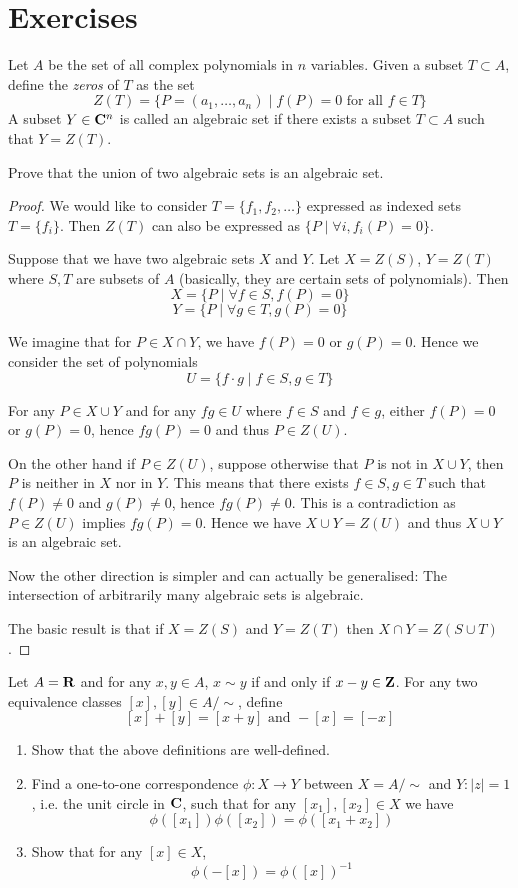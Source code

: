 \section*{Exercises}
\begin{prbm}
Let $A$ be the set of all complex polynomials in $n$ variables. Given a subset $T \subset A$, define the \textit{zeros} of $T$ as the set
\[ Z(T) = \{P=(a_1,\dots,a_n) \mid f(P)=0 \text{ for all } f \in T\} \]
A subset $Y \in \mathbf C^n$ is called an algebraic set if there exists a subset $T \subset A$ such that $Y=Z(T)$.

Prove that the union of two algebraic sets is an algebraic set.
\end{prbm}
\begin{proof}
We would like to consider $T=\{f_1, f_2, \dots\}$ expressed as indexed sets $T=\{f_i\}$. Then $Z(T)$ can also be expressed as $\{P \mid \forall i, f_i(P)=0\}$.

Suppose that we have two algebraic sets $X$ and $Y$. Let $X=Z(S)$, $Y=Z(T)$ where $S,T$ are subsets of $A$ (basically, they are certain sets of polynomials). Then
\[ X=\{P \mid \forall f \in S, f(P)=0\} \]
\[ Y=\{P \mid \forall g \in T, g(P)=0\} \]

We imagine that for $P\in X\cap Y$, we have $f(P)=0$ or $g(P)=0$. Hence we consider the set of polynomials
\[ U=\{f\cdot g \mid f\in S, g\in T\} \]

For any $P\in X\cup Y$ and for any $fg\in U$ where $f\in S$ and $f\in g$, either $f(P)=0$ or $g(P)=0$, hence $fg(P)=0$ and thus $P\in Z(U)$.

On the other hand if $P\in Z(U)$, suppose otherwise that $P$ is not in $X\cup Y$, then $P$ is neither in $X$ nor in $Y$. This means that there exists $f\in S,g\in T$ such that $f(P)\neq0$ and $g(P)\neq0$, hence $fg(P)\neq0$. This is a contradiction as $P\in Z(U)$ implies $fg(P)=0$. Hence we have $X\cup Y=Z(U)$ and thus $X\cup Y$ is an algebraic set.

Now the other direction is simpler and can actually be generalised: The intersection of arbitrarily many algebraic sets is algebraic. 

The basic result is that if $X=Z(S)$ and $Y=Z(T)$ then $X\cap Y=Z(S\cup T)$. 
\end{proof}
\pagebreak

\begin{prbm}
Let $A = \mathbf R$ and for any $x, y \in A$, $x \sim y$ if and only if $x-y \in \mathbf Z$. For any two equivalence classes $[x], [y] \in A/\sim$, define
\[ [x] + [y] = [x + y] \text{ and } -[x] = [-x] \]
\begin{enumerate}[label=(\alph*)]
\item Show that the above definitions are well-defined.
\item Find a one-to-one correspondence $\phi:X \to Y$ between $X = A/\sim$ and $Y:|z| = 1$, i.e. the unit circle in $\mathbf C$, such that for any $[x_1], [x_2] \in X$ we have
\[ \phi([x_1])\phi([x_2]) = \phi([x_1 + x_2]) \]
\item Show that for any $[x] \in X$,
\[ \phi(-[x]) = \phi([x])^{-1} \]
\end{enumerate}
\end{prbm}

